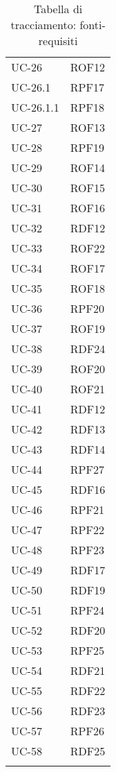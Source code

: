 \begin{longtable}{| p{5cm} | p{5cm} |}
		\rowcolor{LightGray}
		UC-26 & ROF12 \\
		UC-26.1 & RPF17 \\
		\rowcolor{LightGray}
		UC-26.1.1 & RPF18\\
		UC-27 & ROF13 \\
		\rowcolor{LightGray}
		UC-28 & RPF19 \\
		UC-29 & ROF14 \\
		\rowcolor{LightGray}
		UC-30 & ROF15 \\
		UC-31 & ROF16 \\
		\rowcolor{LightGray}
		UC-32 & RDF12\\
		UC-33 & ROF22\\
		UC-34 & ROF17\\
		\rowcolor{LightGray}
		UC-35 & ROF18\\
		UC-36 & RPF20\\
		\rowcolor{LightGray}
		UC-37 & ROF19\\
		UC-38 & RDF24\\
		UC-39 & ROF20\\
		\rowcolor{LightGray}
		UC-40 & ROF21\\
		UC-41 & RDF12\\
		\rowcolor{LightGray}
		UC-42 & RDF13\\
		UC-43 & RDF14\\
		\rowcolor{LightGray}
		UC-44 & RPF27\\
		UC-45 & RDF16\\
		\rowcolor{LightGray}
		UC-46 & RPF21\\
		UC-47 & RPF22\\
		\rowcolor{LightGray}
		UC-48 & RPF23\\
		UC-49 & RDF17 \\
		\rowcolor{LightGray}
		UC-50 & RDF19 \\
		UC-51 & RPF24 \\
		\rowcolor{LightGray}
		UC-52 & RDF20 \\
		UC-53 & RPF25 \\
		\rowcolor{LightGray}
		UC-54 & RDF21 \\
		UC-55 & RDF22 \\
		\rowcolor{LightGray}
		UC-56 & RDF23 \\
		UC-57 & RPF26 \\
		UC-58 & RDF25\\
		\rowcolor{LightGray}
		\hline
		\caption{Tabella di tracciamento: fonti-requisiti}
\end{longtable}
\newpage
